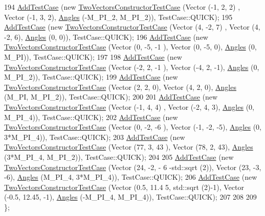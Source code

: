 \begin{DoxyCode}
194   \hyperlink{classns3_1_1TestCase_a3718088e3eefd5d6454569d2e0ddd835}{AddTestCase} (\textcolor{keyword}{new} \hyperlink{classTwoVectorsConstructorTestCase}{TwoVectorsConstructorTestCase} (Vector (-1, 2, 2)
      ,    Vector (-1, 3, 2), \hyperlink{structns3_1_1Angles}{Angles} (-M\_PI\_2, M\_PI\_2)), TestCase::QUICK);
195   \hyperlink{classns3_1_1TestCase_a3718088e3eefd5d6454569d2e0ddd835}{AddTestCase} (\textcolor{keyword}{new} \hyperlink{classTwoVectorsConstructorTestCase}{TwoVectorsConstructorTestCase} (Vector (4, -2, 7)
      ,    Vector (4, -2, 6), \hyperlink{structns3_1_1Angles}{Angles} (0, 0)), TestCase::QUICK);
196   \hyperlink{classns3_1_1TestCase_a3718088e3eefd5d6454569d2e0ddd835}{AddTestCase} (\textcolor{keyword}{new} \hyperlink{classTwoVectorsConstructorTestCase}{TwoVectorsConstructorTestCase} (Vector (0, -5, -1
      ),   Vector (0, -5, 0), \hyperlink{structns3_1_1Angles}{Angles} (0, M\_PI)), TestCase::QUICK);
197 
198   \hyperlink{classns3_1_1TestCase_a3718088e3eefd5d6454569d2e0ddd835}{AddTestCase} (\textcolor{keyword}{new} \hyperlink{classTwoVectorsConstructorTestCase}{TwoVectorsConstructorTestCase} (Vector (-2, 2, -1
      ),     Vector (-4, 2, -1), \hyperlink{structns3_1_1Angles}{Angles} (0, M\_PI\_2)), TestCase::QUICK);
199   \hyperlink{classns3_1_1TestCase_a3718088e3eefd5d6454569d2e0ddd835}{AddTestCase} (\textcolor{keyword}{new} \hyperlink{classTwoVectorsConstructorTestCase}{TwoVectorsConstructorTestCase} (Vector (2, 2, 0),
          Vector (4, 2, 0), \hyperlink{structns3_1_1Angles}{Angles} (M\_PI, M\_PI\_2)), TestCase::QUICK);
200 
201   \hyperlink{classns3_1_1TestCase_a3718088e3eefd5d6454569d2e0ddd835}{AddTestCase} (\textcolor{keyword}{new} \hyperlink{classTwoVectorsConstructorTestCase}{TwoVectorsConstructorTestCase} (Vector (-1, 4, 4)
      ,     Vector (-2, 4, 3), \hyperlink{structns3_1_1Angles}{Angles} (0, M\_PI\_4)), TestCase::QUICK);
202   \hyperlink{classns3_1_1TestCase_a3718088e3eefd5d6454569d2e0ddd835}{AddTestCase} (\textcolor{keyword}{new} \hyperlink{classTwoVectorsConstructorTestCase}{TwoVectorsConstructorTestCase} (Vector (0, -2, -6
      ),    Vector (-1, -2, -5), \hyperlink{structns3_1_1Angles}{Angles} (0, 3*M\_PI\_4)), TestCase::QUICK);
203   \hyperlink{classns3_1_1TestCase_a3718088e3eefd5d6454569d2e0ddd835}{AddTestCase} (\textcolor{keyword}{new} \hyperlink{classTwoVectorsConstructorTestCase}{TwoVectorsConstructorTestCase} (Vector (77, 3, 43
      ),    Vector (78, 2, 43), \hyperlink{structns3_1_1Angles}{Angles} (3*M\_PI\_4, M\_PI\_2)), TestCase::QUICK);
204 
205   \hyperlink{classns3_1_1TestCase_a3718088e3eefd5d6454569d2e0ddd835}{AddTestCase} (\textcolor{keyword}{new} \hyperlink{classTwoVectorsConstructorTestCase}{TwoVectorsConstructorTestCase} (Vector (24, -2, -
      6 -std::sqrt (2)), Vector (23, -3, -6), \hyperlink{structns3_1_1Angles}{Angles} (M\_PI\_4, 3*M\_PI\_4)), TestCase::QUICK);
206   \hyperlink{classns3_1_1TestCase_a3718088e3eefd5d6454569d2e0ddd835}{AddTestCase} (\textcolor{keyword}{new} \hyperlink{classTwoVectorsConstructorTestCase}{TwoVectorsConstructorTestCase} (Vector (0.5, 11.4
      5, std::sqrt (2)-1), Vector (-0.5, 12.45, -1), \hyperlink{structns3_1_1Angles}{Angles} (-M\_PI\_4, M\_PI\_4)), TestCase::QUICK);
207 
208 
209 \};
\end{DoxyCode}


